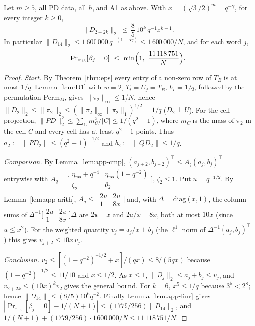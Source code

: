\begin{theorem}\label{thm:steps}
Let $m\ge5$, all PD data, all $h$, and A1 as above. With $x=(\sqrt3/2)^m=q^{-\gamma}$, for every integer $k\ge0$,
\[
\|D_{2+2k}\|_2\ \le\ \frac85\,10^k\,q^{-1}x^{k-1}.
\]
In particular $\|D_{14}\|_2\le1\,600\,000\,q^{-(1+5\gamma)}\le1\,600\,000/N$, and for each word $j$,
\[
\Pr\nolimits_{\pi_{15}}[\beta_j=0]\ \le\ \min\Bigl(1,\ \frac{11\,118\,751}{N}\Bigr).
\]
\end{theorem}
\begin{proof}
\emph{Start.} By Theorem~\ref{thm:eps} every entry of a non-zero row of $T_B$ is at most $1/q$. Lemma~\ref{lem:D1} with $w=2$, $T_i=U_j=T_B$,
$b_\star=1/q$, followed by the permutation $\mathrm{Perm}_M$, gives $\|\pi_2\|_\infty\le1/N$, hence $\|D_2\|_2\le\|\pi_2\|_2\le(\|\pi_2\|_\infty\|\pi_2\|_1)^{1/2}=1/q$
($D_2\perp U$). For the cell projection, $\|PD\|_2^2\le\sum_C m_C^2/|C|\le1/(q^2-1)$, where $m_C$ is the mass of $\pi_2$ in the cell $C$ and every
cell has at least $q^2-1$ points. Thus $a_2:=\|PD_2\|\le(q^2-1)^{-1/2}$ and $b_2:=\|QD_2\|\le1/q$.

\emph{Comparison.} By Lemma~\ref{lem:app-cmp}, $(a_{j+2},b_{j+2})^\top\le A_q(a_j,b_j)^\top$ entrywise with
$A_q=\bigl[\begin{smallmatrix}\eta_{\mathrm{rss}}+q^{-4}&\eta_{\mathrm{rss}}(1+q^{-2})\\ \zeta_2&\theta_2\end{smallmatrix}\bigr]$, $\zeta_2\le1$. Put $u=q^{-1/2}$.
By Lemma~\ref{lem:app-arith}, $A_q\le\bigl[\begin{smallmatrix}2u&2u\\1&8x\end{smallmatrix}\bigr]$ and, with $\Delta=\mathrm{diag}(x,1)$, the column sums of
$\Delta^{-1}\bigl[\begin{smallmatrix}2u&2u\\1&8x\end{smallmatrix}\bigr]\Delta$ are $2u+x$ and $2u/x+8x$, both at most $10x$ (since $u\le x^2$). For the weighted quantity
$v_j=a_j/x+b_j$ (the $\ell^1$ norm of $\Delta^{-1}(a_j,b_j)^\top$) this gives $v_{j+2}\le10x\,v_j$.

\emph{Conclusion.} $v_2\le[(1-q^{-2})^{-1/2}+x]/(qx)\le8/(5qx)$ because $(1-q^{-2})^{-1/2}\le11/10$ and $x\le1/2$. As $x\le1$,
$\|D_j\|_2\le a_j+b_j\le v_j$, and $v_{2+2k}\le(10x)^kv_2$ gives the general bound. For $k=6$, $x^5\le1/q$ because $3^5<2^8$; hence
$\|D_{14}\|\le(8/5)10^6q^{-2}$. Finally Lemma~\ref{lem:app-line} gives
$|\Pr_{\pi_{15}}[\beta_j=0]-1/(N+1)|\le(1779/256)\|D_{14}\|_2$, and $1/(N+1)+(1779/256)\cdot1\,600\,000/N\le11\,118\,751/N$.
\end{proof}
